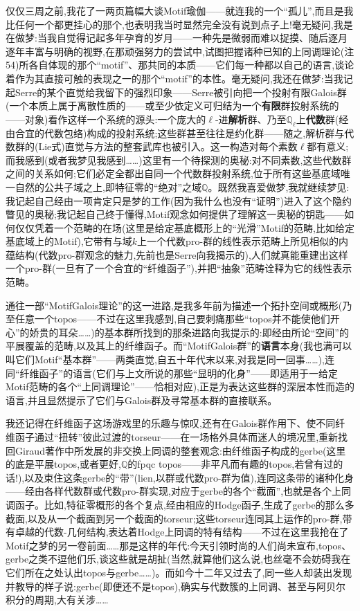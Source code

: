 仅仅三周之前,我花了一两页篇幅大谈Motif瑜伽——就连我的一个“孤儿”,而且是我比任何一个都更挂心的那个,也表明我当时显然完全没有说到点子上!毫无疑问,我是在做梦:当我自觉得记起多年孕育的岁月——一种先是微弱而难以捉摸、随后逐月逐年丰富与明确的视野,在那顽强努力的尝试中,试图把握诸种已知的上同调理论(注54)所各自体现的那个“motif”、那共同的本质——它们每一种都以自己的语言,谈论着作为其直接可触的表现之一的那个“motif”的本性。毫无疑问,我还在做梦:当我记起Serre的某个直觉给我留下的强烈印象——Serre被引向把一个投射有限Galois群(一个本质上属于离散性质的——或至少依定义可归结为一个\textbf{有限}群投射系统的——对象)看作这样一个系统的源头:一个庞大的$\ell$-进\textbf{解析}群、乃至$\mathbb{Q}_\ell$上\textbf{代数}群(经由合宜的代数包络)构成的投射系统;这些群甚至往往是约化群——随之,解析群与代数群的(Lie式)直觉与方法的整套武库也被引入。这一构造对每个素数$\ell$都有意义;而我感到(或者我梦见我感到……)这里有一个待探测的奥秘:对不同素数,这些代数群之间的关系如何;它们必定全都出自同一个代数群投射系统,位于所有这些基底域唯一自然的公共子域之上,即特征零的“绝对”之域$\mathbb{Q}$。既然我喜爱做梦,我就继续梦见:我记起自己经由一项肯定只是梦的工作(因为我什么也没有“证明”)进入了这个隐约瞥见的奥秘;我记起自己终于懂得,Motif观念如何提供了理解这一奥秘的钥匙——如何仅仅凭着一个范畴的在场(这里是给定基底概形\dmark{}上的“光滑”Motif的范畴,比如给定基底域上的Motif),它带有与域$k$上一个代数pro-群的线性表示范畴上所见相似的内蕴结构(代数pro-群观念的魅力,先前也是Serre向我揭示的),人们就真能重建出这样一个pro-群(一旦有了一个合宜的“纤维函子”),并把“抽象”范畴诠释为它的线性表示范畴。

通往一部“MotifGalois理论”的这一进路,是我多年前为描述一个拓扑空间或概形(乃至任意一个topos——不过在这里我感到,自己要刺痛那些“topos并不能使他们开心”的娇贵的耳朵……)的基本群所找到的那条进路向我提示的:即经由所论“空间”的平展覆盖的范畴,以及其上的纤维函子。而“MotifGalois群”的\textbf{语言}本身(我也满可以叫它们Motif“基本群”——两类直觉,自五十年代末以来,对我是同一回事……),连同“纤维函子”的语言(它们与上文所说的那些“显明的化身”——即适用于一给定Motif范畴的各个“上同调理论”——恰相对应),正是为表达这些群的深层本性而造的语言,并且显然提示了它们与Galois群及寻常基本群的直接联系。

我还记得在纤维函子这场游戏里的乐趣与惊叹,还有在Galois群作用下、使不同纤维函子通过“扭转”彼此过渡的torseur——在一场格外具体而迷人的境况里,重新找回Giraud著作中所发展的非交换上同调的整套观念:由纤维函子构成的gerbe(这里的底是平展topos,或者更好,$\mathbb{Q}$的fpqc topos——非平凡而有趣的topos,若曾有过的话!),以及束住这条gerbe的“带”(lien,以群或代数pro-群为值),连同这条带的诸种化身——经由各样代数群或代数pro-群实现,对应于gerbe的各个“截面”,也就是各个上同调函子。比如,特征零概形的各个复点,经由相应的Hodge函子,生成了gerbe的那么多截面,以及从一个截面到另一个截面的torseur;这些torseur连同其上运作的pro-群,带有卓越的代数-几何结构,表达着Hodge上同调的特有结构——不过在这里\dmark{}我抢在了Motif之梦的另一卷前面……那是这样的年代:今天引领时尚的人们尚未宣布,topos、gerbe之类不逗他们乐,谈这些就是胡扯(当然,就算他们这么说,也丝毫不会妨碍我在它们所在之处认出topos与gerbe……)。而如今十二年又过去了,同一些人却装出发现并教导的样子说:gerbe(即便还不是topos),确实与代数簇的上同调、甚至与阿贝尔积分的周期,大有关涉……


